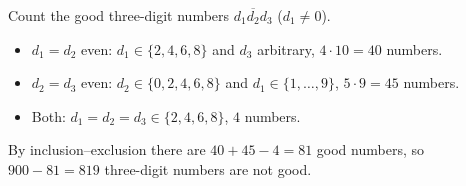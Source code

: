 Count the good three-digit numbers $\overline{d_1d_2d_3}$ ($d_1\ne0$).
\begin{itemize}
\item $d_1=d_2$ even: $d_1\in\{2,4,6,8\}$ and $d_3$ arbitrary, $4\cdot10=40$ numbers.
\item $d_2=d_3$ even: $d_2\in\{0,2,4,6,8\}$ and $d_1\in\{1,\dots,9\}$, $5\cdot9=45$ numbers.
\item Both: $d_1=d_2=d_3\in\{2,4,6,8\}$, $4$ numbers.
\end{itemize}
By inclusion--exclusion there are $40+45-4=81$ good numbers, so $900-81=\boxed{819}$ three-digit numbers are not good.
